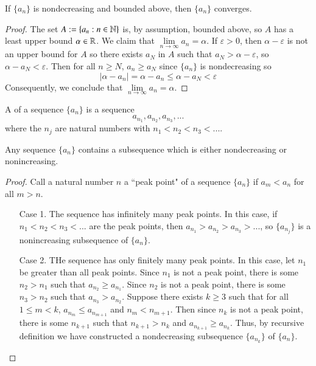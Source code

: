 \begin{thm}
    If $\{a_n\}$ is nondecreasing and bounded above, then $\{a_n\}$ converges.
\end{thm}
\begin{proof}
    The set $A := \{a_n:n\in\mathbb N\}$ is, by assumption, bounded above, so $A$ has a least upper bound $\alpha \in \mathbb R$. We claim that $\lim\limits_{n\rightarrow \infty}a_n = \alpha$. If $\varepsilon > 0$, then $\alpha - \varepsilon$ is not an upper bound for $A$ so there exists $a_N$ in $A$ such that $a_N > \alpha - \varepsilon$, so $\alpha - a_N < \varepsilon$. Then for all $n \geq N$, $a_n \geq a_N$ since $\{a_n\}$ is nondecreasing so \begin{equation*}
        |\alpha - a_n| = \alpha - a_n \leq \alpha - a_N < \varepsilon
    \end{equation*}
    Consequently, we conclude that $\lim\limits_{n\rightarrow \infty}a_n = \alpha$.
\end{proof}


\begin{defn}
    A  of a sequence $\{a_n\}$ is a sequence \begin{equation*}
        a_{n_1},a_{n_2},a_{n_3},...
    \end{equation*}
    where the $n_j$ are natural numbers with $n_1 < n_2 < n_3 < ...$.
\end{defn}

\begin{lem}
    Any sequence $\{a_n\}$ contains a subsequence which is either nondecreasing or nonincreasing.
\end{lem}
\begin{proof}
    Call a natural number $n$ a ``peak point" of a sequence $\{a_n\}$ if $a_m < a_n$ for all $m > n$.\begin{itemize}[leftmargin=+1in]
        \item[Case 1.] The sequence has infinitely many peak points. In this case, if $n_1 < n_2 < n_3 < ...$ are the peak points, then $a_{n_1} > a_{n_2} > a_{n_3} > ...$, so $\{a_{n_j}\}$ is a nonincreasing subsequence of $\{a_n\}$.
        \item[Case 2.] THe sequence has only finitely many peak points. In this case, let $n_1$ be greater than all peak points. Since $n_1$ is not a peak point, there is some $n_2 > n_1$ such that $a_{n_2} \geq a_{n_1}$. Since $n_2$ is not a peak point, there is some $n_3 > n_2$ such that $a_{n_3} > a_{n_2}$. Suppose there exists $k \geq 3$ such that for all $1 \leq m < k$, $a_{n_m} \leq a_{n_{m+1}}$ and $n_m < n_{m+1}$. Then since $n_k$ is not a peak point, there is some $n_{k+1}$ such that $n_{k+1} > n_k$ and $a_{n_{k+1}} \geq a_{n_k}$. Thus, by recursive definition we have constructed a nondecreasing subsequence $\{a_{n_k}\}$ of $\{a_n\}$.
    \end{itemize}
\end{proof}


